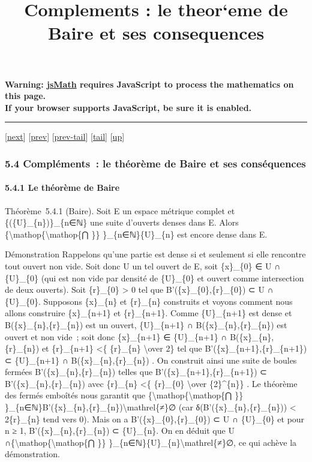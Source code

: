 \documentclass[]{article}
\title{Complements : le theor`eme de Baire et ses consequences}
\author{}
\date{}
\begin{document}
\maketitle

\textbf{Warning: \href{http://www.math.union.edu/locate/jsMath}{jsMath}
requires JavaScript to process the mathematics on this page.\\ If your
browser supports JavaScript, be sure it is enabled.}

\begin{center}\rule{3in}{0.4pt}\end{center}

{[}\href{coursse31.html}{next}{]} {[}\href{coursse29.html}{prev}{]}
{[}\href{coursse29.html\#tailcoursse29.html}{prev-tail}{]}
{[}\hyperref[tailcoursse30.html]{tail}{]}
{[}\href{coursch6.html\#coursse30.html}{up}{]}

\subsubsection{5.4 Compléments~: le théorème de Baire et ses
conséquences}

\paragraph{5.4.1 Le théorème de Baire}

Théorème~5.4.1 (Baire). Soit E un espace métrique complet et
\{(\{U\}\_\{n\})\}\_\{n∈ℕ\} une suite d'ouverts denses dans E. Alors
\{\textbackslash{}mathop\{\textbackslash{}mathop\{⋂ \}\}
\}\_\{n∈ℕ\}\{U\}\_\{n\} est encore dense dans E.

Démonstration Rappelons qu'une partie est dense si et seulement si elle
rencontre tout ouvert non vide. Soit donc U un tel ouvert de E, soit
\{x\}\_\{0\} ∈ U ∩ \{U\}\_\{0\} (qui est non vide par densité de
\{U\}\_\{0\} et ouvert comme intersection de deux ouverts). Soit
\{r\}\_\{0\} \textgreater{} 0 tel que B'(\{x\}\_\{0\},\{r\}\_\{0\}) ⊂ U
∩ \{U\}\_\{0\}. Supposons \{x\}\_\{n\} et \{r\}\_\{n\} construits et
voyons comment nous allons construire \{x\}\_\{n+1\} et \{r\}\_\{n+1\}.
Comme \{U\}\_\{n+1\} est dense et B(\{x\}\_\{n\},\{r\}\_\{n\}) est un
ouvert, \{U\}\_\{n+1\} ∩ B(\{x\}\_\{n\},\{r\}\_\{n\}) est ouvert et non
vide~; soit donc \{x\}\_\{n+1\} ∈ \{U\}\_\{n+1\} ∩
B(\{x\}\_\{n\},\{r\}\_\{n\}) et \{r\}\_\{n+1\} \textless{}\{
\{r\}\_\{n\} \textbackslash{}over 2\} tel que
B'(\{x\}\_\{n+1\},\{r\}\_\{n+1\}) ⊂ \{U\}\_\{n+1\} ∩
B(\{x\}\_\{n\},\{r\}\_\{n\}) . On construit ainsi une suite de boules
fermées B'(\{x\}\_\{n\},\{r\}\_\{n\}) telles que
B'(\{x\}\_\{n+1\},\{r\}\_\{n+1\}) ⊂ B'(\{x\}\_\{n\},\{r\}\_\{n\}) avec
\{r\}\_\{n\} \textless{}\{ \{r\}\_\{0\} \textbackslash{}over
\{2\}\^{}\{n\}\} . Le théorème des fermés emboîtés nous garantit que
\{\textbackslash{}mathop\{\textbackslash{}mathop\{⋂ \}\}
\}\_\{n∈ℕ\}B'(\{x\}\_\{n\},\{r\}\_\{n\})\textbackslash{}mathrel\{≠\}∅
(car δ(B'(\{x\}\_\{n\},\{r\}\_\{n\})) \textless{} 2\{r\}\_\{n\} tend
vers 0). Mais on a B'(\{x\}\_\{0\},\{r\}\_\{0\}) ⊂ U ∩ \{U\}\_\{0\} et
pour n ≥ 1, B'(\{x\}\_\{n\},\{r\}\_\{n\}) ⊂ \{U\}\_\{n\}. On en déduit
que U ∩\{\textbackslash{}mathop\{\textbackslash{}mathop\{⋂ \}\}
\}\_\{n∈ℕ\}\{U\}\_\{n\}\textbackslash{}mathrel\{≠\}∅, ce qui achève la
démonstration.
\end{document}
